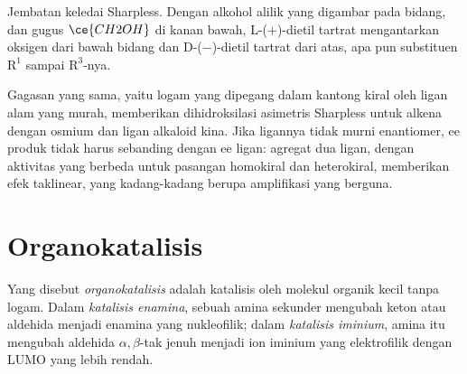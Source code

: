 \begin{omfigure}

{\small Jembatan keledai Sharpless. Dengan alkohol alilik yang digambar pada bidang, dan
gugus $\ce{CH2OH}$ di kanan bawah, L-($+$)-dietil tartrat mengantarkan oksigen dari
bawah bidang dan D-($-$)-dietil tartrat dari atas, apa pun
substituen $\mathrm R^1$ sampai $\mathrm R^3$-nya.}
\end{omfigure}

Gagasan yang sama, yaitu logam yang dipegang dalam kantong kiral oleh ligan alam yang murah, memberikan
dihidroksilasi asimetris Sharpless untuk alkena dengan osmium dan ligan alkaloid
kina. Jika ligannya tidak murni enantiomer, ee produk
tidak harus sebanding dengan ee ligan: agregat dua ligan, dengan
aktivitas yang berbeda untuk pasangan homokiral dan heterokiral, memberikan efek
taklinear, yang kadang-kadang berupa amplifikasi yang berguna.

\section{Organokatalisis}

\begin{definition}[Organokatalisis]\label{def:b3:asymmetric-synthesis:organocatalysis}
Yang disebut \emph{organokatalisis} adalah katalisis oleh molekul organik
kecil tanpa logam. Dalam \emph{katalisis enamina}, sebuah
amina sekunder mengubah keton atau aldehida menjadi enamina yang nukleofilik; dalam
\emph{katalisis iminium}, amina itu mengubah aldehida $\alpha,\beta$-tak jenuh
menjadi ion iminium yang elektrofilik dengan LUMO yang lebih rendah.
\end{definition}

